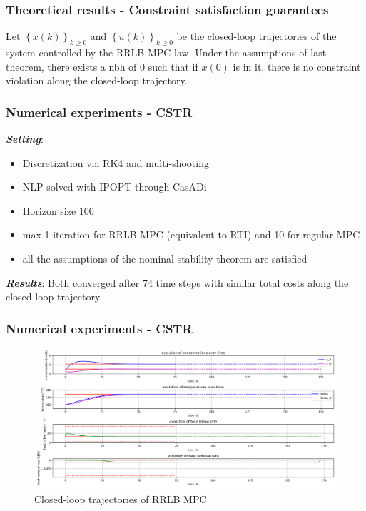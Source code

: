 \documentclass[10pt]{beamer}
\begin{document}
\begin{frame}
    \frametitle{Theoretical results - Constraint satisfaction guarantees}
    \begin{theorem}
        Let $\left\{ x(k) \right\}_{k\geq 0}$ and $\left\{ u(k) \right\}_{k\geq 0}$ be the closed-loop trajectories of the system controlled by the RRLB MPC law.
        Under the assumptions of last theorem, there exists a nbh of 0 such that if $x(0)$ is in it, there is no constraint violation along the closed-loop trajectory.
    \end{theorem}
\end{frame}

\begin{frame}
    \frametitle{Numerical experiments - CSTR}
    \textit{\textbf{Setting}}:
    \begin{itemize}[label=\textbullet]
        \item Discretization via RK4 and multi-shooting
        \item NLP solved with IPOPT through CasADi
        \item Horizon size 100
        \item max 1 iteration for RRLB MPC (equivalent to RTI) and 10 for regular MPC
        \item \checkmark all the assumptions of the nominal stability theorem are satisfied
    \end{itemize}

    \textbf{\textit{Results}}:
    Both converged after 74 time steps with similar total costs along the closed-loop trajectory.    

\end{frame}

\begin{frame}
    \frametitle{Numerical experiments - CSTR}
    \begin{figure}[H]
        \centering
        \includegraphics[width=1.0\textwidth]{../cstr_package/rrlb_mpc.png}
        \caption*{Closed-loop trajectories of RRLB MPC}
    \end{figure}
\end{frame}
\end{document}
